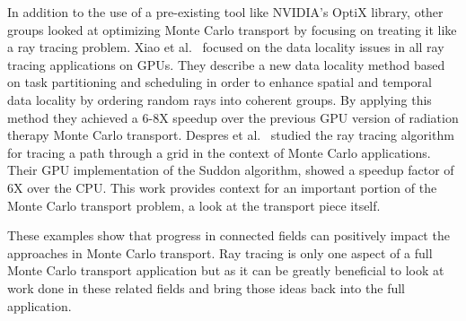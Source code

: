 %
In addition to the use of a pre-existing tool like NVIDIA's OptiX library, other groups looked at optimizing Monte Carlo transport by focusing on treating it like a ray tracing problem.
%
Xiao et al.~\cite{xiao2015monte} focused on the data locality issues in all ray tracing applications on GPUs.
%
They describe a new data locality method based on task partitioning and scheduling in order to enhance spatial and temporal data locality by ordering random rays into coherent groups.
%
By applying this method they achieved a 6-8X speedup over the previous GPU version of radiation therapy Monte Carlo transport. 
%
Despres et al.~\cite{despres2008stream} studied the ray tracing algorithm for tracing a path through a grid in the context of Monte Carlo applications.
%
Their GPU implementation of the Suddon algorithm, showed a speedup factor of 6X over the CPU.
%
This work provides context for an important portion of the Monte Carlo transport problem, a look at the transport piece itself.
%

%
These examples show that progress in connected fields can positively impact the approaches in Monte Carlo transport.
%
Ray tracing is only one aspect of a full Monte Carlo transport application but as it can be greatly beneficial to look at work done in these related fields and bring those ideas back into the full application.

